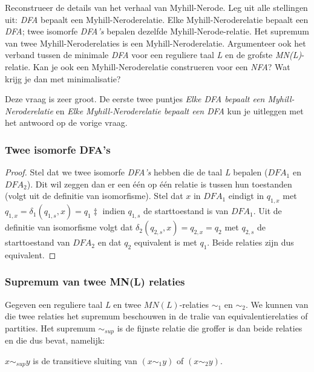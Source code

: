 \begin{quest}
  Reconstrueer de details van het verhaal van Myhill-Nerode. Leg uit alle stellingen uit: \emph{DFA} bepaalt een Myhill-Neroderelatie. Elke Myhill-Neroderelatie bepaalt een \emph{DFA}; twee isomorfe \emph{DFA's} bepalen dezelfde Myhill-Nerode-relatie. Het supremum van twee Myhill-Neroderelaties is een Myhill-Neroderelatie. Argumenteer ook het verband tussen de minimale \emph{DFA} voor een reguliere taal \emph{L} en de grofste \emph{MN(L)}-relatie.
  Kan je ook een Myhill-Neroderelatie construeren voor een \emph{NFA}? Wat krijg je dan met minimalisatie?
\end{quest}

Deze vraag is zeer groot. De eerste twee puntjes \emph{Elke DFA bepaalt een Myhill-Neroderelatie} en \emph{Elke Myhill-Neroderelatie bepaalt een DFA} kun je uitleggen met het antwoord op de vorige vraag.

\subsubsection*{Twee isomorfe DFA's}

\begin{proof}
  Stel dat we twee isomorfe \emph{DFA's} hebben die de taal \emph{L} bepalen ($DFA_1$ en $DFA_2$). Dit wil zeggen dan er een \'e\'en op \'e\'en relatie is tussen hun toestanden (volgt uit de definitie van isomorfisme). Stel dat $x$ in $DFA_1$ eindigt in $q_{1,x}$ met $q_{1,x} = \delta_1(q_{1,s},x) = q_1‡$ indien $q_{1,s}$ de starttoestand is van $DFA_1$. Uit de definitie van isomorfisme volgt dat $\delta_2(q_{2,s},x) = q_{2,x} = q_2$ met $q_{2,s}$ de starttoestand van $DFA_2$ en dat $q_2$ equivalent is met $q_1$. Beide relaties zijn dus equivalent.
\end{proof}

\subsubsection*{Supremum van twee MN(L) relaties}

Gegeven een reguliere taal \emph{L} en twee $MN(L)$-relaties $\sim_1$ en $\sim_2$. We kunnen van die twee relaties het supremum beschouwen in de tralie van equivalentierelaties of partities. Het supremum $\sim_{sup}$ is de fijnste relatie die groffer is dan beide relaties en die dus bevat, namelijk:

\begin{theorem}
  $x \sim_{sup} y$ is de transitieve sluiting van $(x \sim_1 y)$ of $(x \sim_2 y)$.
\end{theorem}

